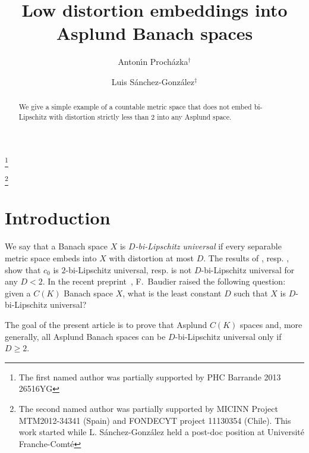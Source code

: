 \documentclass[english,a4paper,12pt]{amsart}
\theoremstyle{plain}
\theoremstyle{definition}
\begin{document}
\title{Low distortion embeddings into Asplund Banach spaces}
\author{Anton\'\i n Proch\'azka$^\dag$}
\address{$^\dag$ Universit\'e Franche-Comt\'e\\
Laboratoire de Math\'ematiques UMR 6623\\
16 route de Gray\\
25030 Besan\c con Cedex\\
France}
\thanks{The first named author was partially supported by  PHC Barrande 2013 26516YG}

\author{Luis S\'anchez-Gonz\'alez$^\ddag$}

\address{$^\ddag$ Departamento de Ingenier{\'i}a Matem{\'a}tica\\ Facultad de CC. F{\'i}sicas y  Matem{\'a}ticas\\ Universidad de Concepci{\'o}n\\ Casilla 160-C, Concepci{\'o}n, Chile}
\thanks{
 The second named author was partially supported by   MICINN Project MTM2012-34341 (Spain) and FONDECYT project 11130354 (Chile). This work started while L. S\'anchez-Gonz\'alez held a post-doc position at Universit\'e Franche-Comt\'e}

\begin{abstract}
We give a simple example of a countable metric space that does not embed bi-Lipschitz with distortion strictly less than 2 into any Asplund space. 
\end{abstract}
\maketitle
\section{Introduction}
We say that a Banach space $X$ is \emph{$D$-bi-Lipschitz universal} if every separable metric space embeds into $X$ with distortion at most $D$. The results of \cite{KL}, resp. \cite{Aharoni}, show that $c_0$ is $2$-bi-Lipschitz universal, resp. is not $D$-bi-Lipschitz universal for any $D<2$. In the recent preprint~\cite{Baudier}, F.~Baudier raised the following question: given a $C(K)$ Banach space $X$, what is the least constant $D$ such that $X$ is $D$-bi-Lipschitz universal? 

The goal of the present article is to prove that Asplund $C(K)$ spaces and, more generally, all Asplund Banach spaces can be $D$-bi-Lipschitz universal only if $D\geq 2$.
\end{document}

